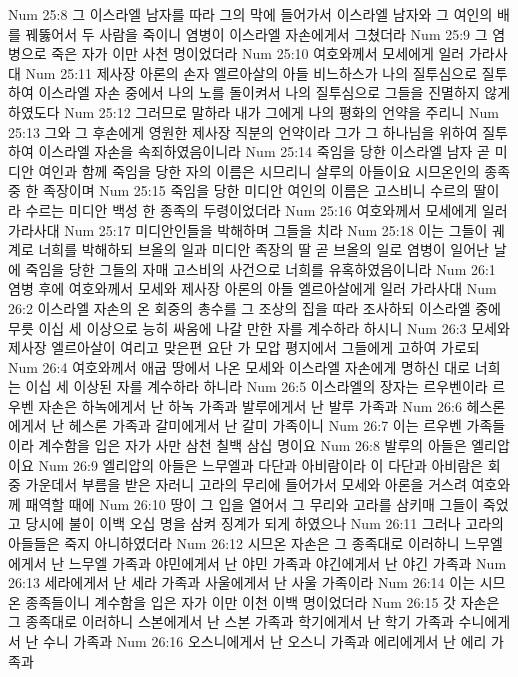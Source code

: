 Num 25:8  그 이스라엘 남자를 따라 그의 막에 들어가서 이스라엘 남자와 그 여인의 배를 꿰뚫어서 두 사람을 죽이니 염병이 이스라엘 자손에게서 그쳤더라
Num 25:9  그 염병으로 죽은 자가 이만 사천 명이었더라
Num 25:10  여호와께서 모세에게 일러 가라사대
Num 25:11  제사장 아론의 손자 엘르아살의 아들 비느하스가 나의 질투심으로 질투하여 이스라엘 자손 중에서 나의 노를 돌이켜서 나의 질투심으로 그들을 진멸하지 않게 하였도다
Num 25:12  그러므로 말하라 내가 그에게 나의 평화의 언약을 주리니
Num 25:13  그와 그 후손에게 영원한 제사장 직분의 언약이라 그가 그 하나님을 위하여 질투하여 이스라엘 자손을 속죄하였음이니라
Num 25:14  죽임을 당한 이스라엘 남자 곧 미디안 여인과 함께 죽임을 당한 자의 이름은 시므리니 살루의 아들이요 시므온인의 종족 중 한 족장이며
Num 25:15  죽임을 당한 미디안 여인의 이름은 고스비니 수르의 딸이라 수르는 미디안 백성 한 종족의 두령이었더라
Num 25:16  여호와께서 모세에게 일러 가라사대
Num 25:17  미디안인들을 박해하며 그들을 치라
Num 25:18  이는 그들이 궤계로 너희를 박해하되 브올의 일과 미디안 족장의 딸 곧 브올의 일로 염병이 일어난 날에 죽임을 당한 그들의 자매 고스비의 사건으로 너희를 유혹하였음이니라
Num 26:1  염병 후에 여호와께서 모세와 제사장 아론의 아들 엘르아살에게 일러 가라사대
Num 26:2  이스라엘 자손의 온 회중의 총수를 그 조상의 집을 따라 조사하되 이스라엘 중에 무릇 이십 세 이상으로 능히 싸움에 나갈 만한 자를 계수하라 하시니
Num 26:3  모세와 제사장 엘르아살이 여리고 맞은편 요단 가 모압 평지에서 그들에게 고하여 가로되
Num 26:4  여호와께서 애굽 땅에서 나온 모세와 이스라엘 자손에게 명하신 대로 너희는 이십 세 이상된 자를 계수하라 하니라
Num 26:5  이스라엘의 장자는 르우벤이라 르우벤 자손은 하녹에게서 난 하녹 가족과 발루에게서 난 발루 가족과
Num 26:6  헤스론에게서 난 헤스론 가족과 갈미에게서 난 갈미 가족이니
Num 26:7  이는 르우벤 가족들이라 계수함을 입은 자가 사만 삼천 칠백 삼십 명이요
Num 26:8  발루의 아들은 엘리압이요
Num 26:9  엘리압의 아들은 느무엘과 다단과 아비람이라 이 다단과 아비람은 회중 가운데서 부름을 받은 자러니 고라의 무리에 들어가서 모세와 아론을 거스려 여호와께 패역할 때에
Num 26:10  땅이 그 입을 열어서 그 무리와 고라를 삼키매 그들이 죽었고 당시에 불이 이백 오십 명을 삼켜 징계가 되게 하였으나
Num 26:11  그러나 고라의 아들들은 죽지 아니하였더라
Num 26:12  시므온 자손은 그 종족대로 이러하니 느무엘에게서 난 느무엘 가족과 야민에게서 난 야민 가족과 야긴에게서 난 야긴 가족과
Num 26:13  세라에게서 난 세라 가족과 사울에게서 난 사울 가족이라
Num 26:14  이는 시므온 종족들이니 계수함을 입은 자가 이만 이천 이백 명이었더라
Num 26:15  갓 자손은 그 종족대로 이러하니 스본에게서 난 스본 가족과 학기에게서 난 학기 가족과 수니에게서 난 수니 가족과
Num 26:16  오스니에게서 난 오스니 가족과 에리에게서 난 에리 가족과
